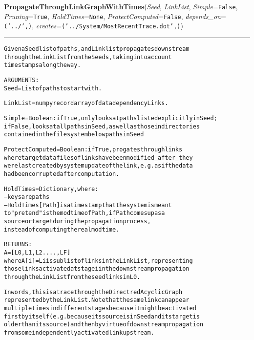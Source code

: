     \label{System:LinkManagement:PropagateThroughLinkGraphWithTimes}

    \vspace{0.5ex}

\hspace{.8\funcindent}\begin{boxedminipage}{\funcwidth}

    \raggedright \textbf{PropagateThroughLinkGraphWithTimes}(\textit{Seed}, \textit{LinkList}, \textit{Simple}={\tt False}, \textit{Pruning}={\tt True}, \textit{HoldTimes}={\tt None}, \textit{ProtectComputed}={\tt False}, \textit{depends\_on}={\tt ('../',)}, \textit{creates}={\tt ('../System/MostRecentTrace.dot',)})

    \vspace{-1.5ex}

    \rule{\textwidth}{0.5\fboxrule}
\setlength{\parskip}{2ex}
\begin{alltt}

Given a Seed list of paths, and Linklist propagates downstream 
through the LinkList from the Seeds, taking into account 
timestamps along the way. 

ARGUMENTS:
Seed = List of paths to start with. 

LinkList = numpy record array of data dependency Links.

Simple = Boolean : if True, only looks at paths listed explicitly in Seed;
if False, looks at all paths in Seed, as well as those in directories 
contained in the filesystem below  paths in Seed

ProtectComputed = Boolean : if True, progates through links 
where target data files of links have been modified \_after\_ they 
were last created by system update of the link, e.g. as if the data 
had been corrupted after computation.  

HoldTimes = Dictionary, where:
-- keys are paths
-- HoldTimes[Path] is a timestamp that the system is meant 
to "pretend" is the mod time of Path, if Path comes up as a 
source or target during the propagation process, 
instead of computing the real mod time. 
                
RETURNS:
        A = [L0,L1,L2 ...., LF]
where A[i]  = Li is sublist of links in the LinkList, representing 
those links activated at stage i in the downstream propagation 
through the LinkList from the seed links in L0.  

In words, this is a trace through the Directred Acyclic Graph 
represented by the LinkList.   Note that the same link can appear 
multiple times in different stages because it might be activated 
first by itself (e.g. because its source is in Seed and its target is 
older than its source) and then by virtue of downstream propagation 
from some independently activated link upstream. 
        
\end{alltt}

\setlength{\parskip}{1ex}
    \end{boxedminipage}

